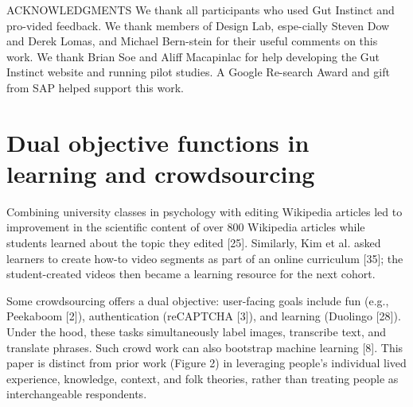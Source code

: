 ACKNOWLEDGMENTS
We thank all participants who used Gut Instinct and pro-vided feedback. We thank members of Design Lab, espe-cially Steven Dow and Derek Lomas, and Michael Bern-stein for their useful comments on this work. We thank Brian Soe and Aliff Macapinlac for help developing the Gut Instinct website and running pilot studies. A Google Re-search Award and gift from SAP helped support this work.

\section{Dual objective functions in learning and crowdsourcing}
Combining university classes in psychology with editing
Wikipedia articles led to improvement in the scientific
content of over 800 Wikipedia articles while students
learned about the topic they edited [25]. Similarly, Kim et
al. asked learners to create how-to video segments as part
of an online curriculum [35]; the student-created videos
then became a learning resource for the next cohort. 

Some crowdsourcing offers a dual objective: user-facing
goals include fun (e.g., Peekaboom [2]), authentication
(reCAPTCHA [3]), and learning (Duolingo [28]). Under the
hood, these tasks simultaneously label images, transcribe
text, and translate phrases. Such crowd work can also bootstrap machine learning [8]. This paper is distinct from prior
work (Figure 2) in leveraging people’s individual lived
experience, knowledge, context, and folk theories, rather
than treating people as interchangeable respondents.
